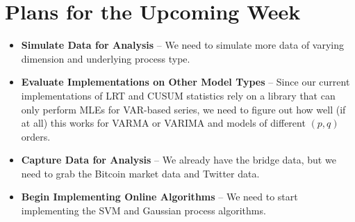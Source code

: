 \documentclass[10pt,letterpaper]{article}
\begin{document}
\section{Plans for the Upcoming Week}

\begin{itemize}
\item \textbf{Simulate Data for Analysis} -- We need to simulate more data of varying dimension and underlying process type. 
\item \textbf{Evaluate Implementations on Other Model Types} -- Since our current implementations of LRT and CUSUM statistics rely on a library that can only perform MLEs for VAR-based series, we need to figure out how well (if at all) this works for VARMA or VARIMA and models of different $(p,q)$ orders.
\item \textbf{Capture Data for Analysis} -- We already have the bridge data, but we need to grab the Bitcoin market data and Twitter data.
\item \textbf{Begin Implementing Online Algorithms} -- We need to start implementing the SVM and Gaussian process algorithms.
\end{itemize}

%
%
\end{document}
